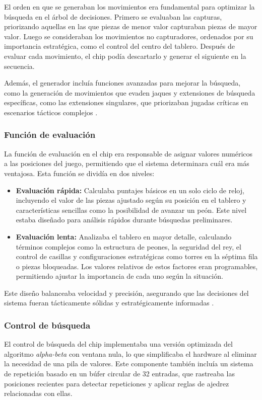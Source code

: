 \documentclass[12pt,a4paper]{article}
\begin{document}
El orden en que se generaban los movimientos era fundamental para optimizar la búsqueda en el árbol de decisiones. Primero se evaluaban las capturas, priorizando aquellas en las que piezas de menor valor capturaban piezas de mayor valor. Luego se consideraban los movimientos no capturadores, ordenados por su importancia estratégica, como el control del centro del tablero. Después de evaluar cada movimiento, el chip podía descartarlo y generar el siguiente en la secuencia.

Además, el generador incluía funciones avanzadas para mejorar la búsqueda, como la generación de movimientos que evaden jaques y extensiones de búsqueda específicas, como las extensiones singulares, que priorizaban jugadas críticas en escenarios tácticos complejos \cite{anantharman1990singular}.

\subsubsection*{Función de evaluación}
La función de evaluación en el chip era responsable de asignar valores numéricos a las posiciones del juego, permitiendo que el sistema determinara cuál era más ventajosa. Esta función se dividía en dos niveles:
\begin{itemize}
    \item \textbf{Evaluación rápida:} Calculaba puntajes básicos en un solo ciclo de reloj, incluyendo el valor de las piezas ajustado según su posición en el tablero y características sencillas como la posibilidad de avanzar un peón. Este nivel estaba diseñado para análisis rápidos durante búsquedas preliminares.
    \item \textbf{Evaluación lenta:} Analizaba el tablero en mayor detalle, calculando términos complejos como la estructura de peones, la seguridad del rey, el control de casillas y configuraciones estratégicas como torres en la séptima fila o piezas bloqueadas. Los valores relativos de estos factores eran programables, permitiendo ajustar la importancia de cada uno según la situación.
\end{itemize}

Este diseño balanceaba velocidad y precisión, asegurando que las decisiones del sistema fueran tácticamente sólidas y estratégicamente informadas \cite{campbell2002deepblue}.

\subsubsection*{Control de búsqueda}
El control de búsqueda del chip implementaba una versión optimizada del algoritmo \textit{alpha-beta}  \cite{knuth1975analysis} con ventana nula, lo que simplificaba el hardware al eliminar la necesidad de una pila de valores. Este componente también incluía un sistema de repetición basado en un búfer circular de 32 entradas, que rastreaba las posiciones recientes para detectar repeticiones y aplicar reglas de ajedrez relacionadas con ellas.
\end{document}
